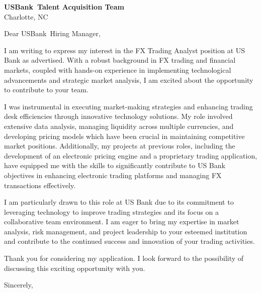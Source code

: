 \documentclass{letter}
\newcommand{\company}{USBank}
\begin{document}
\begin{letter}{\textbf{\company\ Talent Acquisition Team} \\                
    Charlotte, NC }

\opening{Dear \company\ Hiring Manager,}

I am writing to express my interest in the FX Trading Analyst position at US Bank as advertised. With a robust background in FX trading and financial markets, coupled with hands-on experience in implementing technological advancements and strategic market analysis, I am excited about the opportunity to contribute to your team.

I was instrumental in executing market-making strategies and enhancing trading desk efficiencies through innovative technology solutions. My role involved extensive data analysis, managing liquidity across multiple currencies, and developing pricing models which have been crucial in maintaining competitive market positions. Additionally, my projects at previous roles, including the development of an electronic pricing engine and a proprietary trading application, have equipped me with the skills to significantly contribute to US Bank objectives in enhancing electronic trading platforms and managing FX transactions effectively.

I am particularly drawn to this role at US Bank due to its commitment to leveraging technology to improve trading strategies and its focus on a collaborative team environment. I am eager to bring my expertise in market analysis, risk management, and project leadership to your esteemed institution and contribute to the continued success and innovation of your trading activities.

Thank you for considering my application. I look forward to the possibility of discussing this exciting opportunity with you.



\closing{Sincerely,}

\end{letter}
\end{document}
